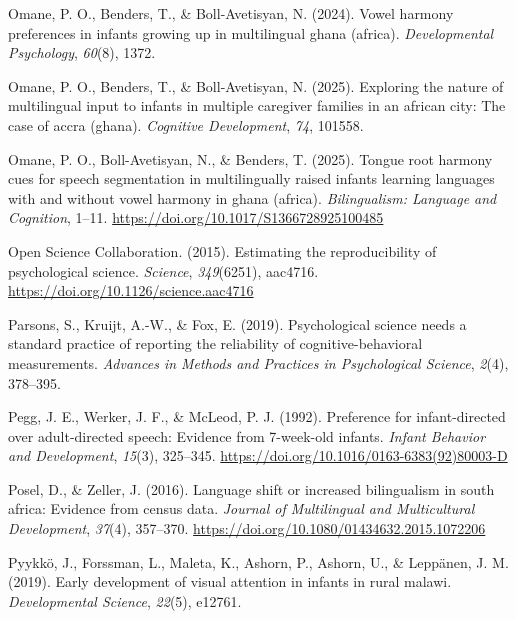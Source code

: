 \documentclass[
  ,man,floatsintext]{apa6}
\newlength{\cslhangindent}
\newlength{\cslentryspacingunit} %
\newenvironment{CSLReferences}[2] %
 {%
  \setlength{\parindent}{0pt}
  \ifodd #1
  \let\oldpar\par
  \def\par{\hangindent=\cslhangindent\oldpar}
  \fi
  \setlength{\parskip}{#2\cslentryspacingunit}
 }%
 {}
\begin{document}
\begin{CSLReferences}{1}{0}
\leavevmode{}%
Omane, P. O., Benders, T., \& Boll-Avetisyan, N. (2024). Vowel harmony preferences in infants growing up in multilingual ghana (africa). \emph{Developmental Psychology}, \emph{60}(8), 1372.

\leavevmode{}%
Omane, P. O., Benders, T., \& Boll-Avetisyan, N. (2025). Exploring the nature of multilingual input to infants in multiple caregiver families in an african city: The case of accra (ghana). \emph{Cognitive Development}, \emph{74}, 101558.

\leavevmode{}%
Omane, P. O., Boll-Avetisyan, N., \& Benders, T. (2025). Tongue root harmony cues for speech segmentation in multilingually raised infants learning languages with and without vowel harmony in ghana (africa). \emph{Bilingualism: Language and Cognition}, 1--11. \url{https://doi.org/10.1017/S1366728925100485}

\leavevmode{}%
Open Science Collaboration. (2015). Estimating the reproducibility of psychological science. \emph{Science}, \emph{349}(6251), aac4716. \url{https://doi.org/10.1126/science.aac4716}

\leavevmode{}%
Parsons, S., Kruijt, A.-W., \& Fox, E. (2019). Psychological science needs a standard practice of reporting the reliability of cognitive-behavioral measurements. \emph{Advances in Methods and Practices in Psychological Science}, \emph{2}(4), 378--395.

\leavevmode{}%
Pegg, J. E., Werker, J. F., \& McLeod, P. J. (1992). Preference for infant-directed over adult-directed speech: Evidence from 7-week-old infants. \emph{Infant Behavior and Development}, \emph{15}(3), 325--345. \url{https://doi.org/10.1016/0163-6383(92)80003-D}

\leavevmode{}%
Posel, D., \& Zeller, J. (2016). Language shift or increased bilingualism in south africa: Evidence from census data. \emph{Journal of Multilingual and Multicultural Development}, \emph{37}(4), 357--370. \url{https://doi.org/10.1080/01434632.2015.1072206}

\leavevmode{}%
Pyykkö, J., Forssman, L., Maleta, K., Ashorn, P., Ashorn, U., \& Leppänen, J. M. (2019). Early development of visual attention in infants in rural malawi. \emph{Developmental Science}, \emph{22}(5), e12761.


\end{CSLReferences}
\end{document}
